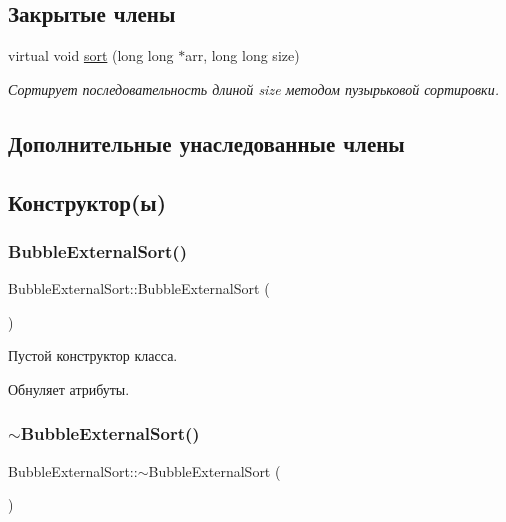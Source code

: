 \subsection*{Закрытые члены}
\begin{DoxyCompactItemize}
\item 
virtual void \hyperlink{class_bubble_external_sort_a785502521871c44e6d9585108e4254bd}{sort} (long long $\ast$arr, long long size)
\begin{DoxyCompactList}\small\item\em Сортирует последовательность длиной size методом пузырьковой сортировки. \end{DoxyCompactList}\end{DoxyCompactItemize}
\subsection*{Дополнительные унаследованные члены}


\subsection{Конструктор(ы)}
\hypertarget{class_bubble_external_sort_a420f93ff7677a75557f805749011f86e}{}\label{class_bubble_external_sort_a420f93ff7677a75557f805749011f86e} 
\subsubsection{\texorpdfstring{Bubble\+External\+Sort()}{BubbleExternalSort()}}
{\footnotesize\ttfamily Bubble\+External\+Sort\+::\+Bubble\+External\+Sort (\begin{DoxyParamCaption}{ }\end{DoxyParamCaption})}



Пустой конструктор класса. 

Обнуляет атрибуты. \hypertarget{class_bubble_external_sort_a2075c6e2117da937f397ceb993336e81}{}\label{class_bubble_external_sort_a2075c6e2117da937f397ceb993336e81} 
\subsubsection{\texorpdfstring{$\sim$\+Bubble\+External\+Sort()}{~BubbleExternalSort()}}
{\footnotesize\ttfamily Bubble\+External\+Sort\+::$\sim$\+Bubble\+External\+Sort (\begin{DoxyParamCaption}{ }\end{DoxyParamCaption})}



